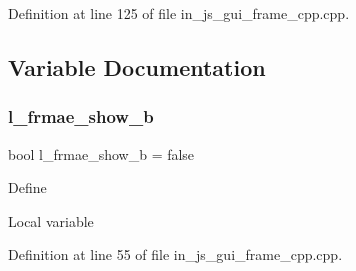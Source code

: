Definition at line 125 of file in\+\_\+js\+\_\+gui\+\_\+frame\+\_\+cpp.\+cpp.



\subsection{Variable Documentation}
\mbox{\label{group___g_u_i_ga1abd408fef2ab9bfeafa4b963d2e4119}} 
\subsubsection{l\_frmae\_show\_b}
{\footnotesize\ttfamily bool l\+\_\+frmae\+\_\+show\+\_\+b = false}

Define

Local variable 

Definition at line 55 of file in\+\_\+js\+\_\+gui\+\_\+frame\+\_\+cpp.\+cpp.

